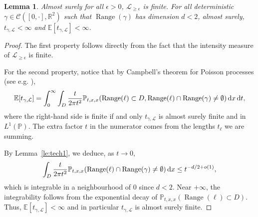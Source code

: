 \documentclass[11pt]{article}
\newtheorem{lemma}[theorem]{Lemma}
\def\d{\,{\rm d}}
\DeclareMathOperator{\Range}{Range}
\begin{document}
\begin{lemma}
  \label{le:item:tmax}
  Almost surely for all $\epsilon>0$, $\mathcal{L}_{\geq \epsilon}$ is finite.
  For all deterministic $\gamma\in \mathcal{C}([0,\cdot],\mathbb{R}^2)$ such that $\Range(\gamma)$ has dimension $d<2$, almost surely, $t_{\gamma,\mathcal{L}}<\infty$ and $\mathbb{E}[ t_{\gamma,\mathcal{L}}]<\infty $.
\end{lemma}
\begin{proof}
  The first property follows directly from the fact that the intensity measure of $\mathcal{L}_{\geq \epsilon}$ is finite.

  For the second property, notice that by Campbell's theorem for Poisson processes (see e.g. \cite{Kingman}),
  \[
  \mathbb{E}[ t_{\gamma,\mathcal{L}}]= \int_0^\infty \int_D \frac{t }{2\pi t^2} \mathbb{P}_{t,x,x}(\Range(\ell)\subset D,  \Range(\ell)\cap \Range(\gamma)\neq \emptyset   ) \d x\d t,
  \]
  where the right-hand side is finite if and only $t_{\gamma,\mathcal{L}}$ is almost surely finite and in $L^1(\mathbb{P})$.
  The extra factor $t$ in the numerator comes from the lengths $t_\ell$ we are summing.

  By Lemma~\ref{le:tech1},
  we deduce, as $t\to 0$,
  \[
  \int_D \frac{t }{2\pi t^2} \mathbb{P}_{t,x,x}(\Range(\ell)\cap \Range(\gamma)\neq \emptyset ) \d x \leq t^{-d/2+o(1)},
  \]
  which is integrable in a neighbourhood of $0$ since $d<2$.
  Near $+\infty$, the integrability follows from the exponential decay of $\mathbb{P}_{t,x,x}(\Range(\ell)\subset D)$.
  Thus, $  \mathbb{E}[ t_{\gamma,\mathcal{L}}  ]<\infty$ and in particular $t_{\gamma,\mathcal{L}}$ is almost surely finite.
\end{proof}
\end{document}
